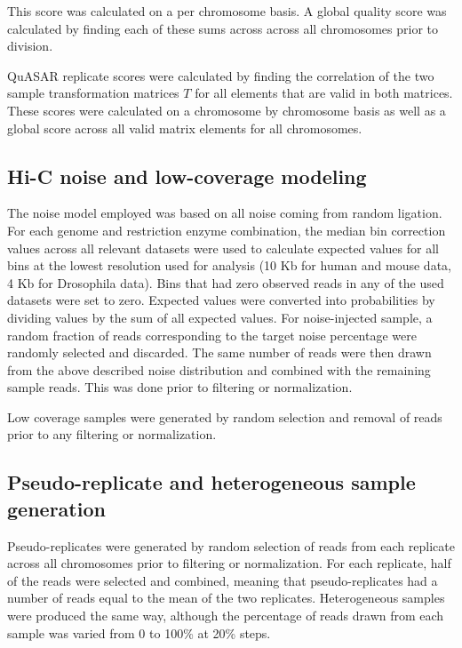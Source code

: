 This score was calculated on a per chromosome basis. A global quality score was calculated by finding each of these sums across across all chromosomes prior to division.

QuASAR replicate scores were calculated by finding the correlation of the two sample transformation matrices $T$ for all elements that are valid in both matrices. These scores were calculated on a chromosome by chromosome basis as well as a global score across all valid matrix elements for all chromosomes.

\subsection{Hi-C noise and low-coverage modeling}

The noise model employed was based on all noise coming from random ligation. For each genome and restriction enzyme combination, the median bin correction values across all relevant datasets were used to calculate expected values for all bins at the lowest resolution used for analysis (10 Kb for human and mouse data, 4 Kb for Drosophila data). Bins that had zero observed reads in any of the used datasets were set to zero. Expected values were converted into probabilities by dividing values by the sum of all expected values. For noise-injected sample, a random fraction of reads corresponding to the target noise percentage were randomly selected and discarded. The same number of reads were then drawn from the above described noise distribution and combined with the remaining sample reads. This was done prior to filtering or normalization.

Low coverage samples were generated by random selection and removal of reads prior to any filtering or normalization.

\subsection{Pseudo-replicate and heterogeneous sample generation}

Pseudo-replicates were generated by random selection of reads from each replicate across all chromosomes prior to filtering or normalization. For each replicate, half of the reads were selected and combined, meaning that pseudo-replicates had a number of reads equal to the mean of the two replicates. Heterogeneous samples were produced the same way, although the percentage of reads drawn from each sample was varied from 0 to 100\% at 20\% steps.

